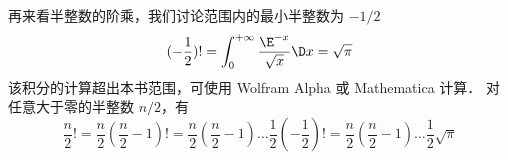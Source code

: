 再来看半整数的阶乘，我们讨论范围内的最小半整数为 $-1/2$ 
\begin{equation}
(-\frac 12) ! = \int_0^{ + \infty } {\frac{{{\E^{ - x}}}}{{\sqrt x }}\D x} = \sqrt{\pi}
\end{equation}
该积分的计算超出本书范围，可使用 Wolfram Alpha 或 Mathematica 计算．%
对任意大于零的半整数 $n/2$，有
\begin{equation}
\frac{n}{2}! = \frac{n}{2} \left(\frac{n}{2}-1 \right)! = \frac{n}{2} \left(\frac{n}{2}-1\right) \dots \frac 12 \left(-\frac 12\right) ! = \frac{n}{2} \left(\frac{n}{2}-1\right) \dots \frac 12 \sqrt{\pi}
\end{equation}














